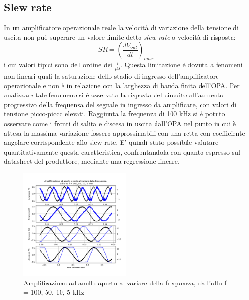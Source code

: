 \documentclass[journal]{IEEEtran}
\begin{document}
\subsection{\textbf{Slew rate}}
In un amplificatore operazionale reale la velocità di variazione della tensione di uscita non può superare un valore limite detto \textit{slew-rate} o velocità di risposta:
\begin{equation}
    SR = (\frac{dV_{out}}{dt})_{max}
\end{equation}
i cui valori tipici sono dell'ordine dei $\frac{V}{\mu s}$.
Questa limitazione è dovuta a fenomeni non lineari quali la saturazione dello stadio di ingresso dell'amplificatore operazionale e non è in relazione con la larghezza di banda finita dell'OPA. 
Per analizzare tale fenomeno si è osservata la risposta del circuito all'aumento progressivo della frequenza del segnale in ingresso da amplificare, con valori di tensione picco-picco elevati. Raggiunta la frequenza di 100 kHz si è potuto osservare come i fronti di salita e discesa in uscita dall'OPA nel punto in cui è attesa la massima variazione fossero approssimabili con una retta con coefficiente angolare corrispondente allo slew-rate. E' quindi stato possibile valutare quantitativamente questa caratteristica, confrontandola con quanto espresso sul datasheet del produttore, mediante una regressione lineare.
\begin{figure}[H]%
\begin {center}
\includegraphics[width=0.50\textwidth]{analysis/output/OPA-open-loop-slew-rate.pdf}
\caption{Amplificazione ad anello aperto al variare della frequenza,  dall'alto f = 100, 50, 10, 5 kHz}
\label{fig:slew-rate-table}
\end {center}
\end{figure}
\end{document}
